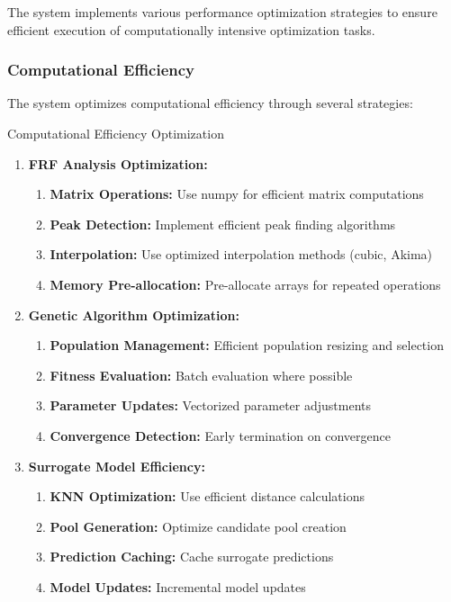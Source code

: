 \documentclass[12pt,a4paper]{article}
\begin{document}
The system implements various performance optimization strategies to ensure efficient execution of computationally intensive optimization tasks.

\subsubsection{Computational Efficiency}

The system optimizes computational efficiency through several strategies:

\begin{algorithm}
\caption{Computational Efficiency Optimization}
\begin{enumerate}
    \item \textbf{FRF Analysis Optimization:}
    \begin{enumerate}
        \item \textbf{Matrix Operations:} Use numpy for efficient matrix computations
        \item \textbf{Peak Detection:} Implement efficient peak finding algorithms
        \item \textbf{Interpolation:} Use optimized interpolation methods (cubic, Akima)
        \item \textbf{Memory Pre-allocation:} Pre-allocate arrays for repeated operations
    \end{enumerate}
    \item \textbf{Genetic Algorithm Optimization:}
    \begin{enumerate}
        \item \textbf{Population Management:} Efficient population resizing and selection
        \item \textbf{Fitness Evaluation:} Batch evaluation where possible
        \item \textbf{Parameter Updates:} Vectorized parameter adjustments
        \item \textbf{Convergence Detection:} Early termination on convergence
    \end{enumerate}
    \item \textbf{Surrogate Model Efficiency:}
    \begin{enumerate}
        \item \textbf{KNN Optimization:} Use efficient distance calculations
        \item \textbf{Pool Generation:} Optimize candidate pool creation
        \item \textbf{Prediction Caching:} Cache surrogate predictions
        \item \textbf{Model Updates:} Incremental model updates
    \end{enumerate}
\end{enumerate}
\end{algorithm}
\end{document}
